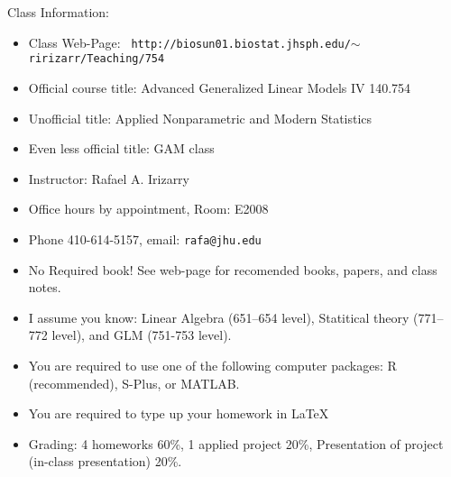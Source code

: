 \documentclass[12pt]{article}
\begin{document}
Class Information:
\begin{itemize}
\item Class Web-Page: {\tt
    http://biosun01.biostat.jhsph.edu/$\sim$ririzarr/Teaching/754}
\item Official course title: Advanced Generalized Linear Models IV 140.754
\item Unofficial title: Applied Nonparametric and Modern Statistics
\item Even less official title: GAM class
\item Instructor: Rafael A. Irizarry
\item Office hours by appointment, Room: E2008 
\item Phone 410-614-5157, email: {\tt rafa@jhu.edu}

\item No Required book! See web-page for recomended books, papers, and
  class notes. 
\item I assume you know: Linear Algebra (651--654 level), Statitical
  theory (771--772 level), and GLM (751-753 level).
\item You are required to use one of the following computer packages:
  R (recommended), S-Plus, or MATLAB. 

\item You are required to type up your homework in \LaTeX
\item Grading: 4 homeworks 60\%, 1 applied project 20\%, Presentation
  of project (in-class presentation) 20\%.
\end{itemize}
\end{document}
